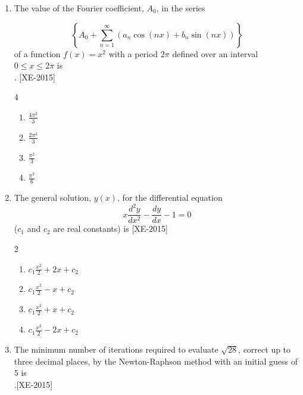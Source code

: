 \documentclass[journal]{IEEEtran}
\begin{document}
\begin{enumerate}
\begin{multicols}{4}
\begin{enumerate}
    \item zero
    \item 1
    \item 2
    \item $\infty$
\end{enumerate}
\end{multicols}
    \item The value of the Fourier coefficient, $A_0$, in the series 
    
    \[  \left\{ A_0 + \sum_{n=1}^{\infty} \left( a_n \cos(nx) + b_n \sin(nx) \right) \right\}
   \]
    of a function $f(x) = x^2$ with a period $2\pi$ defined over an interval $0 \leq x \leq 2\pi$ is \\. \hfill{[XE-2015]}
    \begin{multicols}{4}
        
    
    \begin{enumerate}
        \item $\frac{4 \pi^2}{3}$
        \item $\frac{2 \pi^2}{3}$
        \item $\frac{\pi^2}{3}$
        \item $\frac{\pi^2}{6}$
    \end{enumerate}
    \end{multicols}

    \item The general solution, $y(x)$, for the differential equation 
\[
    x \frac{d^2 y}{dx^2} - \frac{dy}{dx} - 1 = 0
\]
    ($c_1$ and $c_2$ are real constants) is \hfill{[XE-2015]}
    \begin{multicols}{2}
        
    
    \begin{enumerate}
        \item $c_1 \frac{x^2}{2} + 2x + c_2$
        \item $c_1 \frac{x^2}{2} - x + c_2$
        \item $c_1 \frac{x^2}{2} + x + c_2$
        \item $c_1 \frac{x^2}{2} - 2x + c_2$
    \end{enumerate}
\end{multicols}
    \item The minimum number of iterations required to evaluate $\sqrt{28}$, correct up to three decimal places, by the Newton-Raphson method with an initial guess of 5 is \\.\hfill{[XE-2015]} \\
    



\end{enumerate}
\end{document}
